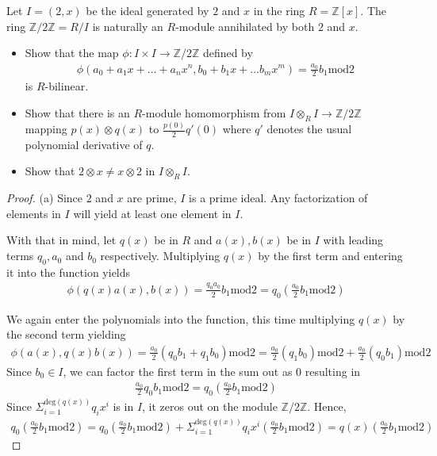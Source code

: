 \documentclass[10pt]{article}
\newcommand{\Z}{\mathbb{Z}}
\newenvironment{problem}[2][Problem]{\begin{trivlist}
		\item[\hskip \labelsep {\bfseries #1}\hskip \labelsep {\bfseries #2.}]}{\end{trivlist}}
\begin{document}
	\begin{problem}{4.17}
		Let $I = (2, x)$ be the ideal generated by $2$ and $x$ in the ring $R = \Z[x]$. The ring $\Z/2\Z = R/I$	is naturally an $R$-module annihilated by both $2$ and $x$.
		\begin{itemize}
			\item[\textbf{(a)}] Show that the map $\phi : I \times I \rightarrow \Z/2\Z$ defined by
			\begin{align*}
				\phi(a_0 + a_1x + ... + a_nx^n, b_0 + b_1x + ... b_mx^m) = \frac{a_0}{2}b_1 \text{mod}2
			\end{align*}
			is $R$-bilinear.
			\item[\textbf{(b)}] Show that there is an $R$-module homomorphism from $I \otimes_R I \rightarrow \Z/2\Z$ mapping $p(x)\otimes q(x)$ to $\frac{p(0)}{2}q'(0)$ where $q'$ denotes the usual polynomial derivative of $q$.
			\item[\textbf{(c)}] Show that $2 \otimes x \not = x \otimes 2$ in $I \otimes_R I$.
		\end{itemize}
		\begin{proof}{(a)}
			Since $2$ and $x$ are prime, $I$ is a prime ideal. Any factorization of elements in $I$ will yield at least one element in $I$.
			
			With that in mind, let $q(x)$ be in $R$ and $a(x), b(x)$ be in $I$ with leading terms $q_0, a_0$ and $b_0$ respectively. Multiplying $q(x)$ by the first term and entering it into the function yields
			\begin{align*}
				\phi(q(x)a(x),b(x)) = \frac{q_0a_0}{2}b_1 \text{mod} 2 = q_0(\frac{a_0}{2}b_1 \text{mod} 2)
			\end{align*}
			
			We again enter the polynomials into the function, this time multiplying $q(x)$ by the second term yielding
			\begin{align*}
				\phi(a(x), q(x)b(x)) = \frac{a_0}{2}(q_0b_1 + q_1b_0) \text{mod} 2 = \frac{a_0}{2}(q_1b_0) \text{mod} 2 + \frac{a_0}{2}(q_0b_1) \text{mod} 2
			\end{align*}
			Since $b_0 \in I$, we can factor the first term in the sum out as $0$ resulting in
			\begin{align*}
				\frac{a_0}{2}q_0b_1 \text{mod} 2 = q_0(\frac{a_0}{2}b_1 \text{mod} 2)
			\end{align*}
			Since $\Sigma_{i=1}^{\text{deg}(q(x))}q_ix^i$ is in $I$, it zeros out on the module $\Z/2\Z$. Hence, 
			\begin{align*}
				q_0(\frac{a_0}{2}b_1 \text{mod} 2) = q_0(\frac{a_0}{2}b_1 \text{mod} 2) + \Sigma_{i=1}^{\text{deg}(q(x))}q_ix^i(\frac{a_0}{2}b_1 \text{mod} 2) = q(x)(\frac{a_0}{2}b_1 \text{mod} 2)
			\end{align*}
			

\end{proof}
\end{problem}
\end{document}

